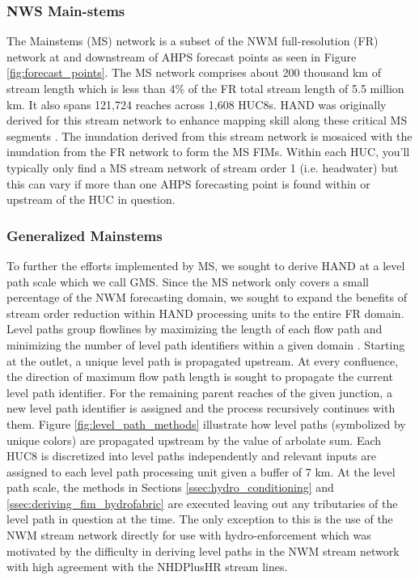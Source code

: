 \subsubsection{NWS Main-stems}
\label{sssec:nws_mainstems}
%
The Mainstems (MS) network is a subset of the NWM full-resolution (FR) network at and downstream of AHPS forecast points as seen in Figure \ref{fig:forecast_points}.
The MS network comprises about 200 thousand km of stream length which is less than 4\% of the FR total stream length of 5.5 million km.
It also spans 121,724 reaches across 1,608 HUC8s.
HAND was originally derived for this stream network to enhance mapping skill along these critical MS segments \cite{djokic2019arc}. 
The inundation derived from this stream network is mosaiced with the inundation from the FR network to form the MS FIMs. 
Within each HUC, you'll typically only find a MS stream network of stream order 1 (i.e. headwater) but this can vary if more than one AHPS forecasting point is found within or upstream of the HUC in question.
%
\subsubsection{Generalized Mainstems}
\label{sssec:generalized_mainstems}
%
To further the efforts implemented by MS, we sought to derive HAND at a level path scale which we call GMS.
Since the MS network only covers a small percentage of the NWM forecasting domain, we sought to expand the benefits of stream order reduction within HAND processing units to the entire FR domain.
Level paths group flowlines by maximizing the length of each flow path and minimizing the number of level path identifiers within a given domain \cite{moore2019user,mckay2012nhdplus}. 
Starting at the outlet, a unique level path is propagated upstream. 
At every confluence, the direction of maximum flow path length is sought to propagate the current level path identifier.
For the remaining parent reaches of the given junction, a new level path identifier is assigned and the process recursively continues with them.
Figure \ref{fig:level_path_methods} illustrate how level paths (symbolized by unique colors) are propagated upstream by the value of arbolate sum.
Each HUC8 is discretized into level paths independently and relevant inputs are assigned to each level path processing unit given a buffer of 7 km.
At the level path scale, the methods in Sections \ref{ssec:hydro_conditioning} and \ref{ssec:deriving_fim_hydrofabric} are executed leaving out any tributaries of the level path in question at the time.
The only exception to this is the use of the NWM stream network directly for use with hydro-enforcement which was motivated by the difficulty in deriving level paths in the NWM stream network with high agreement with the NHDPlusHR stream lines.

